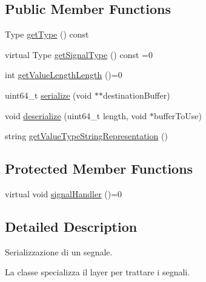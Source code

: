 \subsection*{Public Member Functions}
\begin{DoxyCompactItemize}
\item 
Type \hyperlink{class_signal_serialization_strategy_af13aa61e77fe28a3bafec6686221edbc}{getType} () const 
\item 
virtual Type \hyperlink{class_signal_serialization_strategy_a76deaf1f302850a3952ed059dfc39093}{getSignalType} () const =0
\item 
int \hyperlink{class_signal_serialization_strategy_a6b2b290670195d9777f783ee7dbed9b0}{getValueLengthLength} ()=0
\item 
uint64\_\-t \hyperlink{class_signal_serialization_strategy_ad309e41df968106c274ce2a3aa6d569d}{serialize} (void $\ast$$\ast$destinationBuffer)
\item 
void \hyperlink{class_signal_serialization_strategy_ad62ab074772d584398d8fd22027f4522}{deserialize} (uint64\_\-t length, void $\ast$bufferToUse)
\item 
string \hyperlink{class_signal_serialization_strategy_a263eaab194e4743da3090f413d822b3f}{getValueTypeStringRepresentation} ()
\end{DoxyCompactItemize}
\subsection*{Protected Member Functions}
\begin{DoxyCompactItemize}
\item 
virtual void \hyperlink{class_signal_serialization_strategy_a8db65e6ddc5bd41bfc047f198a88bcaf}{signalHandler} ()=0
\end{DoxyCompactItemize}


\subsection{Detailed Description}
Serializzazione di un segnale. 

La classe specializza il layer per trattare i segnali. 

